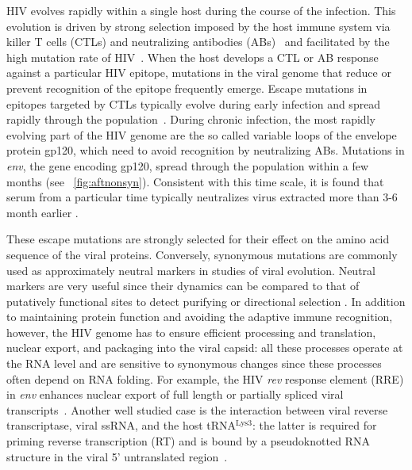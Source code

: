 \documentclass[rmp, twocolumn]{revtex4}
\newcommand{\rev}{\textit{rev}}
\newcommand{\env}{\textit{env}}
\begin{document}
HIV evolves rapidly within a single host during the course of the infection.
This evolution is driven by strong selection imposed by the host immune system
via killer T cells (CTLs) and neutralizing antibodies
(ABs)~\citep{rambaut_causes_2004} and facilitated by the high
mutation rate of HIV~\citep{mansky_lower_1995,abram_nature_2010}. When the host
develops a CTL or AB response against a particular HIV epitope, mutations in the viral genome that
reduce or prevent recognition of the epitope frequently emerge. Escape mutations
in epitopes targeted by CTLs typically evolve during early infection and spread
rapidly through the population~\citep{mcmichael_immune_2009}. During chronic
infection, the most rapidly evolving part of the HIV genome are the so called
variable loops of the envelope protein gp120, which need to avoid recognition by
neutralizing ABs.  Mutations in \env, the gene encoding gp120, spread
through the population within a few months (see \figurename~\ref{fig:aftnonsyn}).
Consistent with this time scale, it is found that serum from a
particular time typically neutralizes virus extracted more than 3-6 month
earlier \citep{richman_rapid_2003}.

These escape mutations are strongly selected for their effect on the amino acid
sequence of the viral proteins. Conversely, synonymous mutations are commonly
used as approximately neutral markers in studies of viral evolution. Neutral
markers are very useful since their dynamics can be compared to
that of putatively functional sites to detect purifying or directional selection
\citep{Bhatt:2011p43255,Hurst:2002p32608,Chen:2004p22606}.
In addition to maintaining protein function and avoiding the adaptive immune
recognition, however, the HIV genome has to ensure efficient processing and translation,
nuclear export, and packaging into the viral capsid: all these processes operate at the RNA
level and are sensitive to synonymous changes since these processes often
depend on RNA folding.
For example, the HIV \rev{} response element (RRE) in \env{} enhances nuclear export of
full length or partially spliced viral transcripts~\citep{fernandes_hiv-1_2012}.
Another well studied case is the interaction between viral reverse transcriptase, viral ssRNA, and the host
tRNA$^\text{Lys3}$: the latter is required for priming reverse transcription
(RT) and is bound by a pseudoknotted RNA structure in the viral 5'
untranslated region~\citep{barat_interaction_1991, paillart_vitro_2002}.
\end{document}
